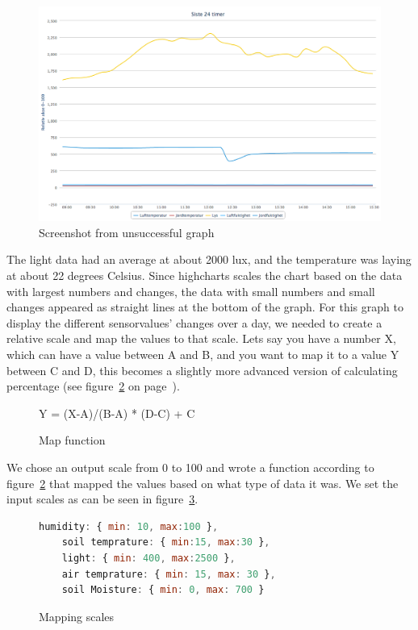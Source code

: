 \begin{figure}
\centering
\includegraphics[width=1\textwidth]{img/interface/badgraph.png}
\caption{Screenshot from unsuccessful graph}
\label{fig:badgraph}
\end{figure}

The light data had an average at about 2000 lux, and the temperature was laying at about 22 degrees Celsius. Since highcharts scales the chart based on the data with largest numbers and changes, the data with small numbers and small changes appeared as straight lines at the bottom of the graph. 
For this graph to display the different sensorvalues’ changes over a day, we needed to create a relative scale and map the values to that scale. Lets say you have a number X, which can have a value between A and B, and you want to map it to a value Y between C and D, this becomes a slightly more advanced version of calculating percentage (see figure~\ref{fig:mapfunc} on page~\pageref{fig:mapfunc}).

\begin{figure}
\centering
Y = (X-A)/(B-A) * (D-C) + C
\caption{Map function}
\label{fig:mapfunc}
\end{figure}

We chose an output scale from 0 to 100 and wrote a function according to figure~\ref{fig:mapfunc} that mapped the values based on what type of data it was. We set the input scales as can be seen in figure~\ref{fig:mapscale}.

\begin{figure}
	\begin{lstlisting}[language=javascript]
	humidity: { min: 10, max:100 },
	soil temprature: { min:15, max:30 },
	light: { min: 400, max:2500 },
	air temprature: { min: 15, max: 30 },
	soil Moisture: { min: 0, max: 700 }
	\end{lstlisting}
	\caption{Mapping scales}
	\label{fig:mapscale}
\end{figure}

